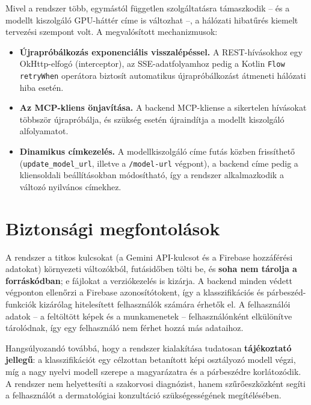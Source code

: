 Mivel a rendszer több, egymástól független szolgáltatásra támaszkodik -- és a
modellt kiszolgáló GPU-háttér címe is változhat --, a hálózati hibatűrés
kiemelt tervezési szempont volt. A megvalósított mechanizmusok:

\begin{itemize}
  \item \textbf{Újrapróbálkozás exponenciális visszalépéssel.} A REST-hívásokhoz
  egy OkHttp-elfogó (interceptor), az SSE-adatfolyamhoz pedig a Kotlin
  \texttt{Flow} \texttt{retryWhen} operátora biztosít automatikus
  újrapróbálkozást átmeneti hálózati hiba esetén.
  \item \textbf{Az MCP-kliens önjavítása.} A backend MCP-kliense a sikertelen
  hívásokat többször újrapróbálja, és szükség esetén újraindítja a modellt
  kiszolgáló alfolyamatot.
  \item \textbf{Dinamikus címkezelés.} A modellkiszolgáló címe futás közben
  frissíthető (\texttt{update\_\allowbreak model\_\allowbreak url}, illetve a \texttt{/model-url}
  végpont), a backend címe pedig a kliensoldali beállításokban módosítható, így
  a rendszer alkalmazkodik a változó nyilvános címekhez.
\end{itemize}

\section{Biztonsági megfontolások}

A rendszer a titkos kulcsokat (a Gemini API-kulcsot és a Firebase hozzáférési
adatokat) környezeti változókból, futásidőben tölti be, és \textbf{soha nem
tárolja a forráskódban}; e fájlokat a verziókezelés is kizárja. A backend minden
védett végponton ellenőrzi a Firebase azonosítótokent, így a klasszifikációs és
párbeszéd-funkciók kizárólag hitelesített felhasználók számára érhetők el. A
felhasználói adatok -- a feltöltött képek és a munkamenetek -- felhasználónként
elkülönítve tárolódnak, így egy felhasználó nem férhet hozzá más adataihoz.

Hangsúlyozandó továbbá, hogy a rendszer kialakítása tudatosan
\textbf{tájékoztató jellegű}: a klasszifikációt egy célzottan betanított
képi osztályozó modell végzi, míg a nagy nyelvi modell szerepe a magyarázatra és a
párbeszédre korlátozódik. A rendszer nem helyettesíti a szakorvosi diagnózist,
hanem szűrőeszközként segíti a felhasználót a dermatológiai konzultáció
szükségességének megítélésében.
